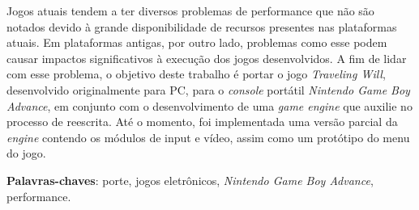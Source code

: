 \begin{resumo}

  Jogos atuais tendem a ter diversos problemas de performance que não são notados devido à grande disponibilidade de recursos presentes nas plataformas atuais. Em plataformas antigas, por outro lado, problemas como esse podem causar impactos significativos à execução dos jogos desenvolvidos. A fim de lidar com esse problema, o objetivo deste trabalho é portar o jogo \textit{Traveling Will}, desenvolvido originalmente para PC, para o \textit{console} portátil \textit{Nintendo Game Boy Advance}, em conjunto com o desenvolvimento de uma \textit{game engine} que auxilie no processo de reescrita. Até o momento, foi implementada uma versão parcial da \textit{engine} contendo os módulos de input e vídeo, assim como um protótipo do menu do jogo.

  \vspace{\onelineskip}

  \noindent
  \textbf{Palavras-chaves}: porte, jogos eletrônicos, \textit{Nintendo Game Boy Advance}, performance.
\end{resumo}
